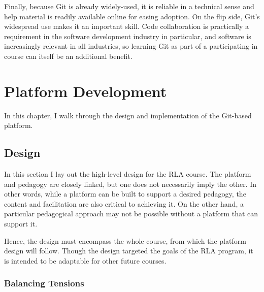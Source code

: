 \documentclass[12pt,twoside]{mitthesis}
\begin{document}
{Finally, because Git is already widely-used, it is reliable in a technical sense and help material is readily available online for easing adoption. On the flip side, Git's widespread use makes it an important skill. Code collaboration is practically a requirement in the software development industry in particular, and software is increasingly relevant in all industries, so learning Git as part of a participating in course can itself be an additional benefit.~\cite{haaranen2015teaching}}

\chapter{Platform Development}

In this chapter, I walk through the design and implementation of the Git-based platform. 

\section{Design}

In this section I lay out the high-level design for the RLA course. The platform and pedagogy are closely linked, but one does not necessarily imply the other. In other words, while a platform can be built to support a desired pedagogy, the content and facilitation are also critical to achieving it. On the other hand, a particular pedagogical approach may not be possible without a platform that can support it. 

Hence, the design must encompass the whole course, from which the platform design will follow. Though the design targeted the goals of the RLA program, it is intended to be adaptable for other future courses.

\subsection{Balancing Tensions}
\end{document}
